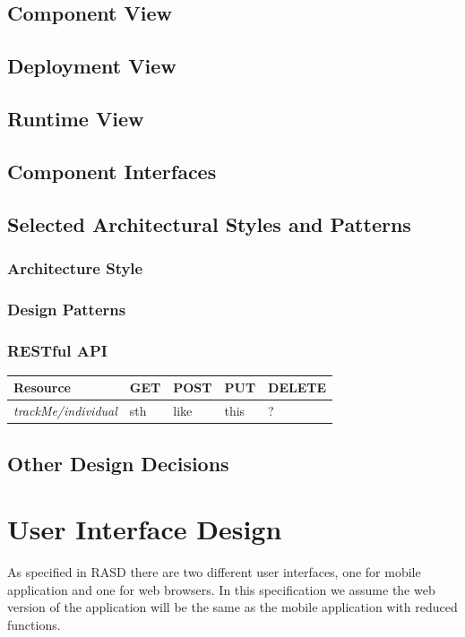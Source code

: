 \documentclass[a4paper]{article}
\begin{document}
\subsection{Component View}

\subsection{Deployment View}

\subsection{Runtime View}

\subsection{Component Interfaces}

\subsection{Selected Architectural Styles and Patterns}
    \subsubsection{Architecture Style}
    \subsubsection{Design Patterns}
    \subsubsection{RESTful API}
    \begin{table}[!htpb]
        \begin{tabular}{|p{3cm}|p{1.8cm}|p{1.8cm}|p{1.8cm}|p{1.8cm}|} 
         \hline
         \textbf{Resource} & \textbf{GET} & \textbf{POST} & \textbf{PUT} & \textbf{DELETE} \\
         \hline
         \textit{trackMe/individual} & sth &like & this & ? \\
         \hline
        \end{tabular}
    \end{table}

\subsection{Other Design Decisions}

\newpage
\section{User Interface Design}
As specified in RASD there are two different user interfaces, one for mobile application and one for web browsers. In this specification we assume the web version of the application will be the same as the mobile application with reduced functions.
\end{document}

